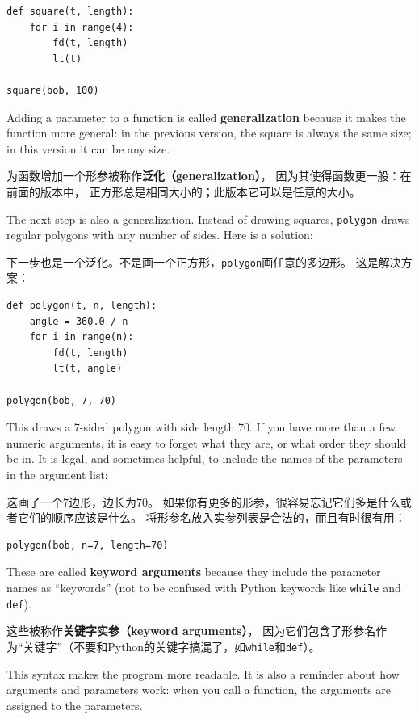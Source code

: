 \documentclass[10pt]{book}
\begin{document}
\begin{CJK}{UTF8}{gbsn}
\begin{verbatim}
def square(t, length):
    for i in range(4):
        fd(t, length)
        lt(t)

square(bob, 100)
\end{verbatim}
%
Adding a parameter to a function is called {\bf generalization}
because it makes the function more general: in the previous
version, the square is always the same size; in this version
it can be any size.

为函数增加一个形参被称作{\bf 泛化（generalization）}，
因为其使得函数更一般：在前面的版本中，
正方形总是相同大小的；此版本它可以是任意的大小。

The next step is also a generalization.  Instead of drawing
squares, {\tt polygon} draws regular polygons with any number of
sides.  Here is a solution:

下一步也是一个泛化。不是画一个正方形，{\tt polygon}画任意的多边形。
这是解决方案：

\begin{verbatim}
def polygon(t, n, length):
    angle = 360.0 / n
    for i in range(n):
        fd(t, length)
        lt(t, angle)

polygon(bob, 7, 70)
\end{verbatim}
%
This draws a 7-sided polygon with side length 70.  If you have
more than a few numeric arguments, it is easy to forget what they
are, or what order they should be in.  It is legal, and sometimes
helpful, to include the names of the parameters in the argument
list:

这画了一个7边形，边长为70。
如果你有更多的形参，很容易忘记它们多是什么或者它们的顺序应该是什么。
将形参名放入实参列表是合法的，而且有时很有用：

\begin{verbatim}
polygon(bob, n=7, length=70)
\end{verbatim}
%
These are called {\bf keyword arguments} because they include
the parameter names as ``keywords'' (not to be confused with
Python keywords like {\tt while} and {\tt def}).

这些被称作{\bf 关键字实参（keyword arguments）}，
因为它们包含了形参名作为``关键字''（不要和Python的关键字搞混了，如{\tt while}和{\tt def}）。

This syntax makes the program more readable.  It is also a reminder
about how arguments and parameters work: when you call a function, the
arguments are assigned to the parameters.


\end{CJK}
\end{document}
